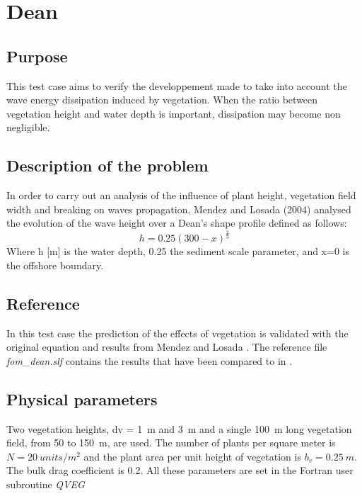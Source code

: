 \section{Dean}
%

%
\subsection{Purpose}
%
This test case aims to verify the developpement made to take into account the wave energy dissipation induced by vegetation. When the ratio between vegetation height and water depth is important, dissipation may become non negligible.
%
\subsection{Description of the problem}
%
In order to carry out an analysis of the influence of plant height, vegetation field width and breaking on waves propagation, Mendez and Losada (2004) analysed the evolution of the wave height over a Dean’s shape profile \cite{Dean1991} defined as follows:
$$
h=0.25(300-x)^\frac{2}{3}
$$
Where h [m] is the water depth, 0.25 the sediment scale parameter, and x=0 is the offshore boundary.

\subsection{Reference}
%
In this test case the prediction of the effects of vegetation is validated with the original equation and results from Mendez and Losada  \cite{Mendez2004}.
The reference file {\it fom\_dean.slf} contains the results that have been compared to \cite{Mendez2004} in \cite{Bacchi2014}.

\subsection{Physical parameters}
%
Two vegetation heights, dv = 1~m and 3~m and a single 100~m long vegetation field, from 50 to 150~m, are used. The number of plants per square meter is $N = 20~units/m^2$ and the plant area per unit height of vegetation is $b_v = 0.25~m.$ The bulk drag coefficient is 0.2. All these parameters are set in the Fortran user subroutine {\it QVEG}

